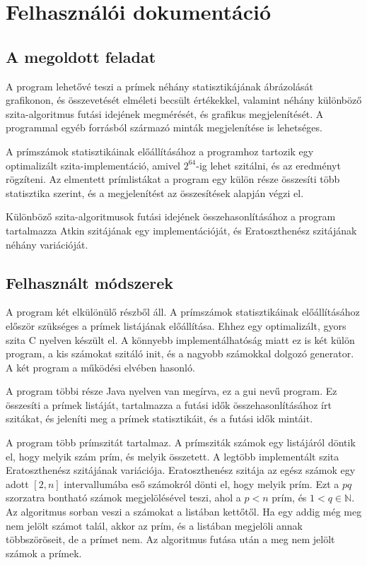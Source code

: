 \chapter{Felhasználói dokumentáció}

\section{A megoldott feladat}

A program lehetővé teszi a prímek néhány statisztikájának ábrázolását grafikonon,
és összevetését elméleti becsült értékekkel, valamint néhány különböző szita-algoritmus
futási idejének megmérését, és grafikus megjelenítését.
A programmal egyéb forrásból származó minták megjelenítése is lehetséges.

A prímszámok statisztikáinak előállításához a programhoz tartozik egy optimalizált
szita-implementáció, amivel $2^{64}$-ig lehet szitálni, és az eredményt rögzíteni.
Az elmentett prímlistákat a program egy külön része összesíti több statisztika szerint,
és a megjelenítést az összesítések alapján végzi el.

Különböző szita-algoritmusok futási idejének összehasonlításához a program tartalmazza
Atkin\cite{atkin} szitájának egy implementációját,
és Eratoszthenész szitájának néhány variációját.

\section{Felhasznált módszerek}

A program két elkülönülő részből áll. A prímszámok statisztikáinak
előállításához először szükséges a prímek listájának előállítása.
Ehhez egy optimalizált, gyors szita C nyelven készült el.
A könnyebb implementálhatóság miatt ez is két külön program, a kis
számokat szitáló init, és a nagyobb számokkal dolgozó generator.
A két program a működési elvében hasonló.

A program többi része Java nyelven van megírva, ez a gui nevű program.
Ez összesíti a prímek listáját, tartalmazza a futási idők összehasonlításához
írt szitákat, és jeleníti meg a prímek statisztikáit, és a futási idők
mintáit.

A program több prímszitát tartalmaz.
A prímsziták számok egy listájáról döntik el, hogy melyik szám prím, és melyik összetett.
A legtöbb implementált szita Eratoszthenész szitájának variációja.
Eratoszthenész szitája az egész számok egy adott $[2, n]$ intervallumába
eső számokról dönti el, hogy melyik prím.
Ezt a $pq$ szorzatra bontható számok megjelölésével teszi,
ahol a $p<n$ prím, és $1<q\in\mathbb{N}$.
Az algoritmus sorban veszi a számokat a listában kettőtől.
Ha egy addig még meg nem jelölt számot talál,
akkor az prím, és a listában megjelöli annak többszöröseit, de a prímet nem.
Az algoritmus futása után a meg nem jelölt számok a prímek.

